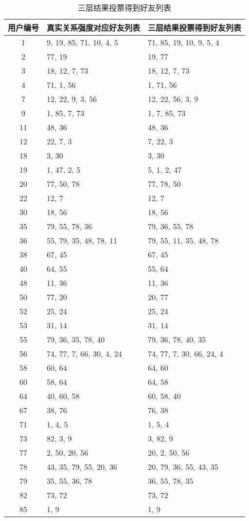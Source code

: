 \begin{table}[htbp]
  \centering
  \caption[三层结果投票得到好友列表]{三层结果投票得到好友列表}
  \label{tab:voteResult}
    \begin{tabular}{cll}%
      \toprule[1.5pt]
      用户编号 & 真实关系强度对应好友列表 & 三层结果投票得到好友列表\\
      \midrule[1pt]
      1 & 9, 19, 85, 71, 10, 4, 5 & 71, 85, 19, 10, 9, 5, 4\\
      2 & 77, 19 & 19, 77\\
      3 & 18, 12, 7, 73 & 18, 12, 7, 73\\
      4 & 71, 1, 56 & 1, 71, 56\\
      7 & 12, 22, 9, 3, 56 & 12, 22, 56, 3, 9\\
      9 & 1, 85, 7, 73 & 1, 7, 85, 73\\
      11 & 48, 36 & 48, 36\\
      12 & 22, 7, 3 & 7, 22, 3\\
      18 & 3, 30 & 3, 30\\
      19 & 1, 47, 2, 5 & 5, 1, 2, 47\\
      20 & 77, 50, 78 & 77, 78, 50\\
      22 & 12, 7 & 12, 7\\
      30 & 18, 56 & 18, 56\\
      35 & 79, 55, 78, 36 & 79, 36, 55, 78\\
      36 & 55, 79, 35, 48, 78, 11 & 79, 55, 11, 35, 48, 78\\
      38 & 67, 45 & 67, 45\\
      40 & 64, 55 & 55, 64\\
      48 & 11, 36 & 11, 36\\
      50 & 77, 20 & 20, 77\\
      52 & 25, 24 & 25, 24\\
      53 & 31, 14 & 31, 14\\
      55 & 79, 36, 35, 78, 40 & 79, 36, 78, 40, 35\\
      56 & 74, 77, 7, 66, 30, 4, 24 & 74, 77, 7, 30, 66, 24, 4\\
      58 & 60, 64 & 64, 60\\
      60 & 58, 64 & 64, 58\\
      64 & 40, 60, 58 & 60, 58, 40\\
      67 & 38, 76 & 76, 38\\
      71 & 1, 4, 5 & 1, 5, 4\\
      73 & 82, 3, 9 & 3, 82, 9\\
      77 & 2, 50, 20, 56 & 20, 2, 50, 56\\
      78 & 43, 35, 79, 55, 20, 36 & 20, 79, 36, 55, 43, 35\\
      79 & 35, 55, 36, 78 & 36, 55, 78, 35\\
      82 & 73, 72 & 73, 72\\
      85 & 1, 9 & 1, 9\\
      \bottomrule[1.5pt]
    \end{tabular}
\end{table}
